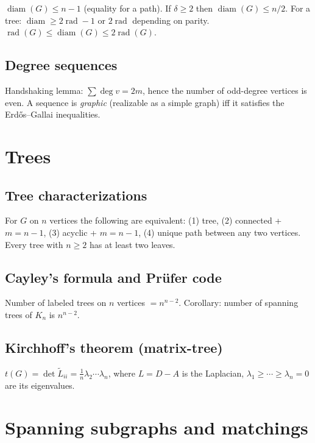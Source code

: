 $\operatorname{diam}(G)\le n-1$ (equality for a path). If $\delta\ge2$ then $\operatorname{diam}(G)\le n/2$. For a tree: $\operatorname{diam}\ge2\operatorname{rad}-1$ or $2\operatorname{rad}$ depending on parity. $\operatorname{rad}(G)\le\operatorname{diam}(G)\le2\operatorname{rad}(G)$.

\subsection{Degree sequences}
\label{subsec:degree-sequences}

Handshaking lemma: $\sum\deg v=2m$, hence the number of odd-degree vertices is even.
A sequence is \textit{graphic} (realizable as a simple graph) iff it satisfies the Erd\H{o}s--Gallai inequalities.

\medskip

\section{Trees}
\label{sec:trees}

\subsection{Tree characterizations}
\label{subsec:tree-char}

For $G$ on $n$ vertices the following are equivalent: (1) tree, (2) connected + $m=n-1$, (3) acyclic + $m=n-1$, (4) unique path between any two vertices. Every tree with $n\ge2$ has at least two leaves.

\subsection{Cayley's formula and Pr\"ufer code}
\label{subsec:cayley-tree}

Number of labeled trees on $n$ vertices $=n^{n-2}$. Corollary: number of spanning trees of $K_n$ is $n^{n-2}$.

\subsection{Kirchhoff's theorem (matrix-tree)}
\label{subsec:kirchhoff}

$t(G)=\det\widetilde L_{ii}=\frac1n\lambda_2\cdots\lambda_n$, where $L=D-A$ is the Laplacian, $\lambda_1\ge\cdots\ge\lambda_n=0$ are its eigenvalues.

\medskip

\section{Spanning subgraphs and matchings}
\label{sec:matchings}

